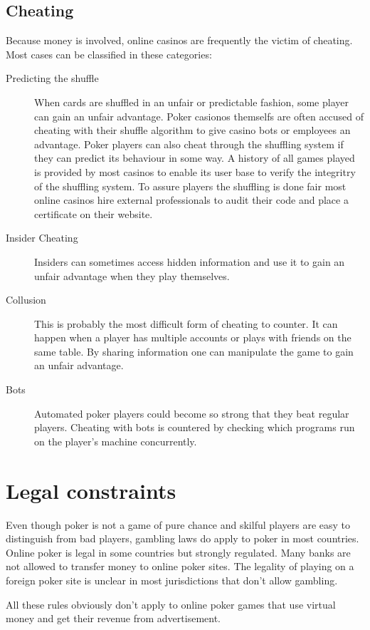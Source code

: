 \documentclass[a4paper,11pt]{report}
\begin{document}
\subsection{Cheating}
Because money is involved, online casinos are frequently the victim of cheating. Most cases can be classified in these categories:
\begin{description}
 \item[Predicting the shuffle] When cards are shuffled in an unfair or predictable fashion, some player can gain an unfair advantage. Poker casionos themselfs are often accused of cheating with their shuffle algorithm to give casino bots or employees an advantage. Poker players can also cheat through the shuffling system if they can predict its behaviour in some way. A history of all games played is provided by most casinos to enable its user base to verify the integritry of the shuffling system. To assure players the shuffling is done fair most online casinos hire external professionals to audit their code and place a certificate on their website. 
 \item[Insider Cheating] Insiders can sometimes access hidden information and use it to gain an unfair advantage when they play themselves.
 \item[Collusion] This is probably the most difficult form of cheating to counter. It can happen when a player has multiple accounts or plays with friends on the same table. By sharing information one can manipulate the game to gain an unfair advantage.
\item[Bots] Automated poker players could become so strong that they beat regular players. Cheating with bots is countered by checking which programs run on the player's machine concurrently.
 \end{description}



\section{Legal constraints}
Even though poker is not a game of pure chance and skilful players are easy to distinguish from bad players, gambling laws do apply to poker in most countries. Online poker is legal in some countries but strongly regulated. Many banks are not allowed to transfer money to online poker sites. The legality of playing on a foreign poker site is unclear in most jurisdictions that don't allow gambling.

All these rules obviously don't apply to online poker games that use virtual money and get their revenue from advertisement.
\end{document}
